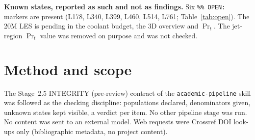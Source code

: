 \documentclass[10pt,a4paper]{article}
\renewcommand{\cite}[1]{[\texttt{#1}]}
\begin{document}
\textbf{Known states, reported as such and not as findings.} Six \texttt{\%\% OPEN:} markers are present (L178,
L340, L399, L460, L514, L761; Table~\ref{tab:open}). The 20M LES is pending in the coolant budget, the 3D overview
and $\Pr_t$. The jet-region $\Pr_t$ value was removed on purpose and was not checked.

\section*{Method and scope}

The Stage~2.5 INTEGRITY (pre-review) contract of the \texttt{academic-pipeline} skill was followed as the checking
discipline: populations declared, denominators given, unknown states kept visible, a verdict per item. No other
pipeline stage was run. No content was sent to an external model. Web requests were Crossref DOI look-ups only
(bibliographic metadata, no project content).

\begin{center}
\end{center}
\end{document}
